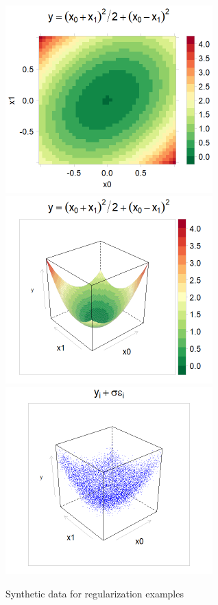 \documentclass[10pt,openany]{article}
\numberwithin{definition}{section}
\numberwithin{example}{section}
\numberwithin{equation}{section}
\numberwithin{figure}{section}
\begin{document}
\begin{figure}
\noindent \begin{centering}
 \includegraphics[width=80mm]{fig/reg-true-levelplot}~
 \includegraphics[width=80mm]{fig/reg-true-wireframe}~
 \includegraphics[width=80mm]{fig/rpart-training-data}
\par\end{centering}

\protect\caption{\label{fig:synthetic-data}Synthetic data for regularization examples}
\end{figure}
\end{document}
